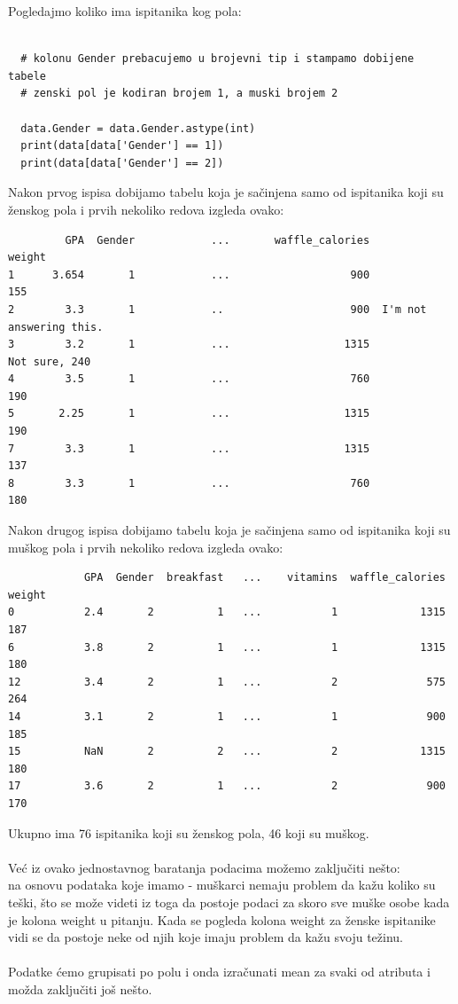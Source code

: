 \documentclass[12pt,a4paper]{article}
\begin{document}
Pogledajmo koliko ima ispitanika kog pola:
\begin{lstlisting}[mathescape=true]
  
  # kolonu Gender prebacujemo u brojevni tip i stampamo dobijene tabele
  # zenski pol je kodiran brojem 1, a muski brojem 2

  data.Gender = data.Gender.astype(int)
  print(data[data['Gender'] == 1])
  print(data[data['Gender'] == 2])

\end{lstlisting}
Nakon prvog ispisa dobijamo tabelu koja je sa\v cinjena samo od ispitanika koji su \v zenskog pola i prvih nekoliko redova izgleda ovako:
\begin{verbatim}
         GPA  Gender            ...       waffle_calories                    weight
1      3.654       1            ...                   900                       155
2        3.3       1            ..                    900  I'm not answering this.
3        3.2       1            ...                  1315             Not sure, 240
4        3.5       1            ...                   760                       190
5       2.25       1            ...                  1315                       190
7        3.3       1            ...                  1315                       137
8        3.3       1            ...                   760                       180
\end{verbatim}
Nakon drugog ispisa dobijamo tabelu koja je sa\v cinjena samo od ispitanika koji su mu\v skog pola i prvih nekoliko redova izgleda ovako:
\begin{verbatim}
            GPA  Gender  breakfast   ...    vitamins  waffle_calories  weight
0           2.4       2          1   ...           1             1315     187
6           3.8       2          1   ...           1             1315     180
12          3.4       2          1   ...           2              575     264
14          3.1       2          1   ...           1              900     185
15          NaN       2          2   ...           2             1315     180
17          3.6       2          1   ...           2              900     170
\end{verbatim}
Ukupno ima 76 ispitanika koji su \v zenskog pola, 46 koji su mu\v skog.
\\ \\
Ve\' c iz ovako jednostavnog baratanja podacima mo\v zemo zaklju\v citi ne\v sto: \\
na osnovu podataka koje imamo - mu\v skarci nemaju problem da ka\v zu koliko su te\v ski, \v sto se mo\v ze videti iz toga da postoje podaci za skoro sve mu\v ske osobe kada je kolona weight u pitanju. Kada se pogleda kolona weight za \v zenske ispitanike vidi se da postoje neke od njih koje imaju problem da ka\v zu svoju te\v zinu.
\\ \\
Podatke \'cemo grupisati po polu i onda izra\v cunati mean za svaki od atributa i mo\v zda zaklju\v citi jo\v s ne\v sto.
\end{document}
